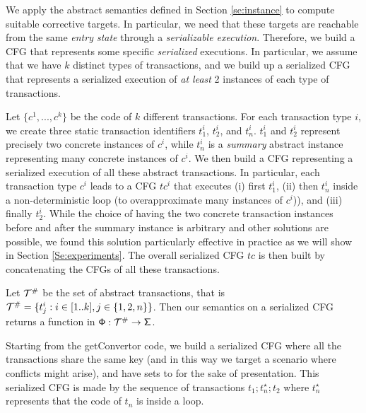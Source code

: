 We apply the abstract semantics defined in Section \ref{se:instance} to compute suitable corrective targets. In particular, we need that these targets are reachable from the same \emph{entry state} through a \emph{serializable execution}. Therefore, we build a CFG that represents some specific \emph{serialized} executions. In particular, we assume that we have $k$ distinct types of transactions, and we build up a serialized CFG that represents a serialized execution of \emph{at least} 2 instances of each type of transactions.

Let $\{c^1, ..., c^k\}$ be the code of $k$ different transactions. For each transaction type $i$, we create three static transaction identifiers $t^i_1$, $t^i_2$, and $t^i_n$. $t^i_1$ and $t^i_2$ represent precisely two concrete instances of $c^i$, while $t^i_n$ is a \emph{summary} abstract instance representing many concrete instances of $c^i$. We then build a CFG representing a serialized execution of all these abstract transactions. In particular, each transaction type $c^i$ leads to a CFG $tc^i$ that executes (i) first $t^i_1$, (ii) then $t^i_n$ inside a non-deterministic loop (to overapproximate many instances of $c^i$)), and (iii) finally $t^i_2$. While the choice of having the two concrete transaction instances before and after the summary instance is arbitrary and other solutions are possible, we found this solution particularly effective in practice as we will show in Section \ref{Se:experiments}. The overall serialized CFG $tc$ is then built by concatenating the CFGs of all these transactions.

Let $\abstracttransactions$ be the set of abstract transactions, that is $\abstracttransactions = \{t^i_j : i \in [1..k], j \in \{1, 2, n\}\}$. Then our semantics on a serialized CFG returns a function in $\amultistate : \abstracttransactions \to \astate$.


\runex
Starting from the \textsf{getConvertor} code, we build a serialized CFG where all the transactions share the same key  (and in this way we target a scenario where conflicts might arise), and have  sets to  for the sake of presentation. This serialized CFG is made by the sequence of transactions $t_1; t_n^\star; t_2$ where $t_n^\star$ represents that the code of $t_n$ is inside a loop.

